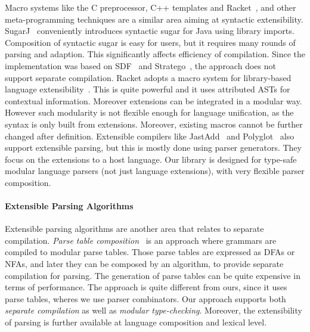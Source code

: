 Macro systems like the C preprocessor, C++ templates and
Racket~\cite{Tobin-Hochstadt2011}, and other meta-programming
techniques are a similar area aiming at syntactic extensibility.
SugarJ~\cite{Erdweg2011} conveniently introduces syntactic sugar for
Java using library imports. Composition of syntactic sugar is easy for
users, but it requires many rounds of parsing and adaption. This
significantly affects efficiency of compilation. Since the
implementation was based on SDF~\cite{Heering1989} and
Stratego~\cite{Visser2001}, the approach does not support separate
compilation. Racket adopts a macro system for library-based language
extensibility~\cite{Tobin-Hochstadt2011}. This is quite powerful and it uses
attributed ASTs for contextual
information. Moreover extensions can be integrated in a modular
way. However such modularity is not flexible enough for language
unification, as the syntax is only built from extensions.  Moreover,
existing macros cannot be further changed after
definition.   Extensible
compilers like JastAdd~\cite{Ekman2007} and
Polyglot~\cite{Nystrom2003} also support extensible parsing, but this
is mostly done using parser generators. They focus on the
extensions to a host language. Our library is designed for type-safe
modular language parsers (not just language
extensions), with very flexible parser composition.


\paragraph{Extensible Parsing Algorithms}
Extensible parsing algorithms are another area that relates to
separate compilation.
\textit{Parse table composition}~\cite{Bravenboer2009}
is an approach where grammars are compiled to
modular parse tables. Those parse tables are expressed as DFAs
or NFAs, and later they can be composed by an algorithm, to provide
separate compilation for parsing. The generation of parse tables can
be quite expensive in terms of performance. The approach
is quite different from ours, since it uses parse
 tables, wheres we use parser combinators.
Our approach supports both
\emph{separate compilation} as well as \emph{modular
  type-checking}. Moreover, the extensibility of parsing is further
available at language composition and lexical level.

